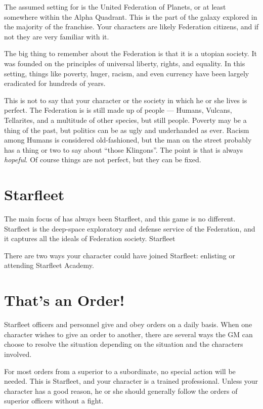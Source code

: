 \documentclass[12pt,titlepage,openany]{book}
\begin{document}
\noindent
The assumed setting for \StarTrekFate{} is the United Federation of Planets, or
at least somewhere within the Alpha Quadrant. This is the part of the galaxy
explored in the majority of the \StarTrek{} franchise. Your characters are
likely Federation citizens, and if not they are very familiar with it.

The big thing to remember about the Federation is that it is a utopian society.
It was founded on the principles of universal liberty, rights, and equality. In
this setting, things like poverty, huger, racism, and even currency have been
largely eradicated for hundreds of years.

This is not to say that your character or the society in which he or she lives
is perfect. The Federation is is still made up of people --- Humans, Vulcans,
Tellarites, and a multitude of other species, but still people. Poverty may be
a thing of the past, but politics can be as ugly and underhanded as ever.
Racism among Humans is considered old-fashioned, but the man on the street
probably has a thing or two to say about ``those Klingons''. The point is that
\StarTrek{} is always \emph{hopeful}. Of course things are not perfect, but
they can be fixed.

\section{Starfleet}

The main focus of \StarTrek{} has always been Starfleet, and this game is no
different. Starfleet is the deep-space exploratory and defense service of the
Federation, and it captures all the ideals of Federation society. Starfleet

There are two ways your character could have joined Starfleet: enlisting or
attending Starfleet Academy.

\section{That's an Order!}\label{sec:orders}

Starfleet officers and personnel give and obey orders on a daily basis. When
one character wishes to give an order to another, there are several ways the GM
can choose to resolve the situation depending on the situation and the
characters involved.

For most orders from a superior to a subordinate, no special action will be
needed. This is Starfleet, and your character is a trained professional.
Unless your character has a good reason, he or she should generally follow the
orders of superior officers without a fight.
\end{document}
